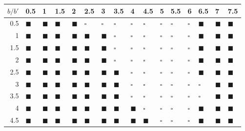 \documentclass[9pt]{IEEEtran}
\begin{document}
\begin{table*}[htb]
\begin{center}
\begin{tabular}{rlllllllllllllll}
  \hline
$b/b'$ & 0.5 & 1 & 1.5 & 2 & 2.5 & 3 & 3.5 & 4 & 4.5 & 5 & 5.5 & 6 & 6.5 & 7 & 7.5 \\ 
  \hline
0.5 & $\blacksquare$ &$\blacksquare$ & $\blacksquare$ & $\blacksquare$ & $\square$ & $\square$ & $\square$ & $\square$ & $\square$ & $\square$ & $\square$ & $\square$ &$\blacksquare$& $\blacksquare$ & $\blacksquare$ \\ 
  1 & $\blacksquare$ &$\blacksquare$ & $\blacksquare$ & $\blacksquare$ & $\blacksquare$ &$\blacksquare$& $\square$ & $\square$ & $\square$ & $\square$ & $\square$ & $\square$ & $\blacksquare$ & $\blacksquare$ & $\blacksquare$ \\ 
  1.5 & $\blacksquare$ & $\blacksquare$ & $\blacksquare$ & $\blacksquare$ & $\blacksquare$ & $\blacksquare$ & $\square$ & $\square$ & $\square$ & $\square$ & $\square$ & $\square$ & $\blacksquare$ & $\blacksquare$ & $\blacksquare$ \\ 
  2 & $\blacksquare$ &$\blacksquare$ & $\blacksquare$& $\blacksquare$ & $\blacksquare$ & $\blacksquare$ & $\square$ & $\square$ & $\square$ & $\square$ & $\square$ &$\square$ & $\blacksquare$ & $\blacksquare$ & $\blacksquare$ \\ 
  2.5 & $\blacksquare$ & $\blacksquare$ & $\blacksquare$ &$\blacksquare$ & $\blacksquare$ & $\blacksquare$& $\blacksquare$ & $\square$ & $\square$ & $\square$ & $\square$ & $\square$ & $\blacksquare$ & $\blacksquare$ &$\blacksquare$ \\ 
  3 &$\blacksquare$ & $\blacksquare$ & $\blacksquare$ & $\blacksquare$ & $\blacksquare$ & $\blacksquare$&$\blacksquare$ &$\square$ & $\square$ & $\square$ & $\square$ & $\square$ & $\square$ & $\blacksquare$ & $\blacksquare$ \\ 
  3.5 & $\blacksquare$ & $\blacksquare$ & $\blacksquare$ & $\blacksquare$ &$\blacksquare$ & $\blacksquare$ & $\blacksquare$ & $\square$ & $\square$ & $\square$ & $\square$ & $\square$ & $\square$ & $\blacksquare$ & $\blacksquare$ \\ 
  4 & $\blacksquare$ &$\blacksquare$ & $\blacksquare$ & $\blacksquare$ & $\blacksquare$ & $\blacksquare$ & $\blacksquare$ &$\blacksquare$ &$\square$ & $\square$& $\square$ & $\square$ & $\blacksquare$ & $\blacksquare$ & $\blacksquare$ \\ 
  4.5 & $\blacksquare$ & $\blacksquare$ & $\blacksquare$ & $\blacksquare$ & $\blacksquare$ & $\blacksquare$ & $\blacksquare$ & $\blacksquare$ & $\blacksquare$ & $\square$ &$\square$ & $\square$ & $\blacksquare$ &$\blacksquare$ & $\blacksquare$ \\ 

\end{tabular}
\end{center}
\end{table*}
\end{document}
